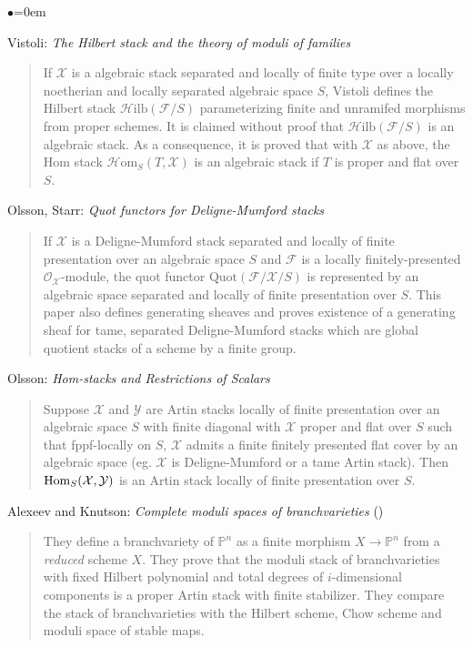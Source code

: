 \begin{list}{$\bullet$}{\leftmargin=0em}
\item Vistoli: \emph{The Hilbert stack and the theory of moduli of families}
\cite{vistoli_hilbert}
\begin{quote}
If $\mathcal{X}$ is a algebraic stack separated and locally of finite type
over a locally noetherian and locally separated algebraic space $S$, Vistoli
defines the Hilbert stack $\mathcal{H}\text{ilb}(\mathcal{F} / S)$
parameterizing finite and unramifed morphisms from proper schemes.
It is claimed without proof that $\mathcal{H}\text{ilb}(\mathcal{F} / S)$
is an algebraic stack.  As a consequence, it is proved that with $\mathcal{X}$
as above, the Hom stack $\mathcal{H} \text{om}_S(T, \mathcal{X})$ is an
algebraic stack if $T$ is proper and flat over $S$.     
\end{quote}
\smallskip
\item Olsson, Starr: \emph{Quot functors for Deligne-Mumford stacks}
\cite{olsson-starr}
\begin{quote}
If $\mathcal{X}$ is a Deligne-Mumford stack separated and locally of finite
presentation over an algebraic space $S$ and $\mathcal{F}$ is a locally
finitely-presented $\mathcal{O}_\mathcal{X}$-module, the quot functor
$\text{Quot}(\mathcal{F} / \mathcal{X} / S)$ is represented by an algebraic
space separated and locally of finite presentation over $S$.  This paper
also defines generating sheaves and proves existence of a generating sheaf
for tame, separated Deligne-Mumford stacks which are global quotient stacks
of a scheme by a finite group.  
\end{quote}
\smallskip

\item Olsson: \emph{Hom-stacks and Restrictions of Scalars}
\cite{olsson_homstacks}
\begin{quote}
Suppose $\mathcal{X}$ and $\mathcal{Y}$ are Artin stacks locally of finite
presentation over an algebraic space $S$ with finite diagonal with
$\mathcal{X}$ proper and flat over $S$ such that fppf-locally on $S$,
$\mathcal{X}$ admits a finite finitely presented flat cover by an algebraic
space (eg. $\mathcal{X}$ is Deligne-Mumford or a tame Artin stack).
Then $\mathop{\rm Hom}\nolimits_S(\mathcal{X}, \mathcal{Y})$ is an Artin stack locally
of finite presentation over $S$.
\end{quote}
\smallskip

\item Alexeev and Knutson:  \emph{Complete moduli spaces of branchvarieties}
(\cite{alexeev-knutson})
\begin{quote}
They define a branchvariety of $\mathbb{P}^n$ as a finite morphism
$X \rightarrow \mathbb{P}^n$ from a \emph{reduced} scheme $X$.  They prove
that the moduli stack of branchvarieties with fixed Hilbert polynomial and
total degrees of $i$-dimensional components is a proper Artin stack with
finite stabilizer.  They compare the stack of branchvarieties with the
Hilbert scheme, Chow scheme and moduli space of stable maps.
\end{quote}
\smallskip


\end{list}
